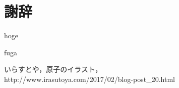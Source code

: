 \documentclass[10,5pt, a4paper, uplatex]{jsarticle}
\begin{document}
        \newpage

    \section*{謝辞} %
        hoge

        \newpage

    \begin{flushleft} %
        \begin{thebibliography}{9} %

                fuga %

                いらすとや，原子のイラスト，
                \\ %
                http://www.irasutoya.com/2017/02/blog-post\_20.html %

        \end{thebibliography}
    \end{flushleft}
\end{document}
